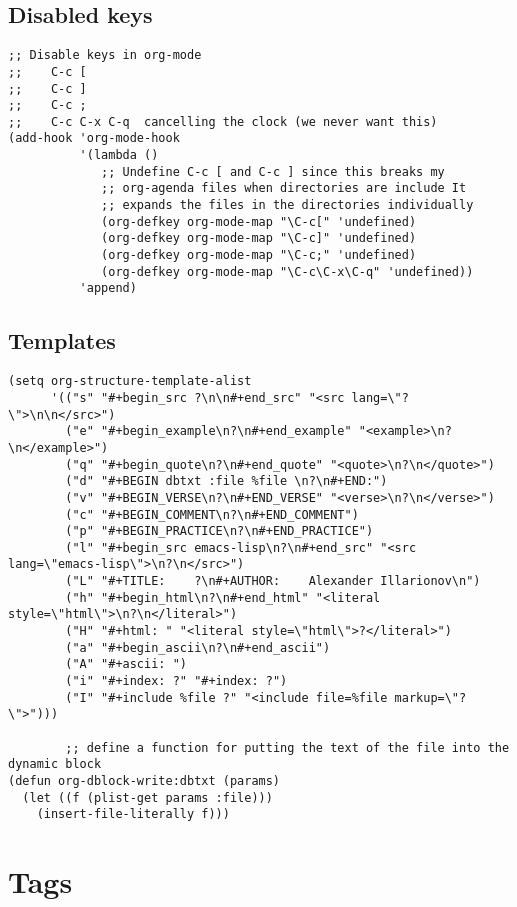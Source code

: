 \documentclass[11pt]{scrartcl}
\begin{document}
\subsection{Disabled keys}
\label{sec:orgheadline48}
\begin{verbatim}
;; Disable keys in org-mode
;;    C-c [
;;    C-c ]
;;    C-c ;
;;    C-c C-x C-q  cancelling the clock (we never want this)
(add-hook 'org-mode-hook
          '(lambda ()
             ;; Undefine C-c [ and C-c ] since this breaks my
             ;; org-agenda files when directories are include It
             ;; expands the files in the directories individually
             (org-defkey org-mode-map "\C-c[" 'undefined)
             (org-defkey org-mode-map "\C-c]" 'undefined)
             (org-defkey org-mode-map "\C-c;" 'undefined)
             (org-defkey org-mode-map "\C-c\C-x\C-q" 'undefined))
          'append)
\end{verbatim}
\subsection{Templates}
\label{sec:orgheadline49}

\begin{verbatim}
(setq org-structure-template-alist
      '(("s" "#+begin_src ?\n\n#+end_src" "<src lang=\"?\">\n\n</src>")
        ("e" "#+begin_example\n?\n#+end_example" "<example>\n?\n</example>")
        ("q" "#+begin_quote\n?\n#+end_quote" "<quote>\n?\n</quote>")
        ("d" "#+BEGIN dbtxt :file %file \n?\n#+END:")
        ("v" "#+BEGIN_VERSE\n?\n#+END_VERSE" "<verse>\n?\n</verse>")
        ("c" "#+BEGIN_COMMENT\n?\n#+END_COMMENT")
        ("p" "#+BEGIN_PRACTICE\n?\n#+END_PRACTICE")
        ("l" "#+begin_src emacs-lisp\n?\n#+end_src" "<src lang=\"emacs-lisp\">\n?\n</src>")
        ("L" "#+TITLE:    ?\n#+AUTHOR:    Alexander Illarionov\n")
        ("h" "#+begin_html\n?\n#+end_html" "<literal style=\"html\">\n?\n</literal>")
        ("H" "#+html: " "<literal style=\"html\">?</literal>")
        ("a" "#+begin_ascii\n?\n#+end_ascii")
        ("A" "#+ascii: ")
        ("i" "#+index: ?" "#+index: ?")
        ("I" "#+include %file ?" "<include file=%file markup=\"?\">")))

        ;; define a function for putting the text of the file into the dynamic block
(defun org-dblock-write:dbtxt (params)
  (let ((f (plist-get params :file)))
    (insert-file-literally f)))
\end{verbatim}

\section{Tags}
\label{sec:orgheadline53}
\end{document}
